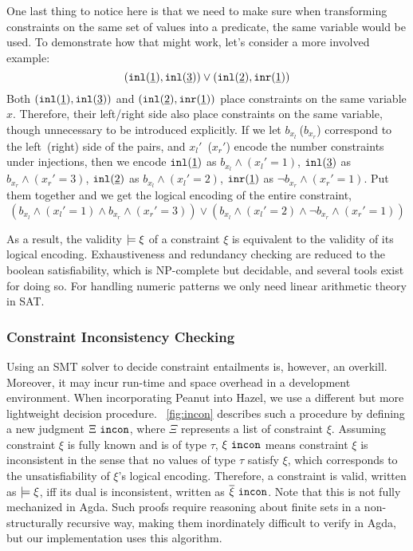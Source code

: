 One last thing to notice here is that we need to make sure when transforming constraints on the same set of values into a predicate, the same variable would be used. To demonstrate how that might work, let's consider a more involved example:
\[ (\mathtt{inl}(\underline{1}) , \mathtt{inl}(\underline{3})) \vee (\mathtt{inl}(\underline{2}) , \mathtt{inr}(\underline{1})) \]
Both $(\mathtt{inl}(\underline{1}) , \mathtt{inl}(\underline{3}))$ and $(\mathtt{inl}(\underline{2}) , \mathtt{inr}(\underline{1}))$ place constraints on the same variable $x$.
Therefore, their left/right side also place constraints on the same variable, though unnecessary to be introduced explicitly.
If we let $b_{x_l}~$($b_{x_r}$) correspond to the left~(right) side of the pairs, and $x_l'$~($x_r'$) encode the number constraints under injections, 
then 
we encode $\mathtt{inl}(\underline{1})$ as $b_{x_l} \wedge (x_l'=1)$, 
$\mathtt{inl}(\underline{3})$ as $b_{x_r} \wedge (x_r'=3)$,
$\mathtt{inl}(\underline{2})$ as $b_{x_l} \wedge (x_l'=2)$,
$\mathtt{inr}(\underline{1})$ as $\neg b_{x_r} \wedge (x_r'=1)$. 
Put them together and we get the logical encoding of the entire constraint, 
\[
(b_{x_l} \wedge (x_l'=1) \wedge
b_{x_r} \wedge (x_r'=3))
\vee
(b_{x_l} \wedge (x_l'=2) \wedge
\neg b_{x_r} \wedge (x_r'=1))
\]

As a result, the validity $\models \xi$ of a constraint $\xi$ is equivalent to the validity of its logical encoding. Exhaustiveness and redundancy checking are reduced to the boolean satisfiability, which is NP-complete but decidable, and several tools exist for doing so. For handling numeric patterns we only need linear arithmetic theory in SAT.

\subsubsection{Constraint Inconsistency Checking}\label{sec:incon}

Using an SMT solver to decide constraint entailments is, however, an overkill. Moreover, it may incur run-time and space overhead in a  development environment. When incorporating Peanut into Hazel, we use a different but more lightweight decision procedure. \figurename~\ref{fig:incon} describes such a procedure by defining a new judgment $\Xi ~\mathtt{incon}$, where $\Xi$ represents a list of constraint $\xi$. Assuming constraint $\xi$ is fully known and is of type $\tau$, $\xi ~\mathtt{incon}$ means constraint $\xi$ is inconsistent in the sense that no values of type $\tau$ satisfy $\xi$, which corresponds to the unsatisfiability of $\xi$'s logical encoding. Therefore, a constraint is valid, written as $\models \xi$, iff its dual is inconsistent, written as $\overline{\xi} ~\mathtt{incon}$. Note that this is not fully mechanized in Agda. Such proofs require reasoning about finite sets in a non-structurally recursive way, making them inordinately difficult to verify in Agda, but our implementation uses this algorithm.


